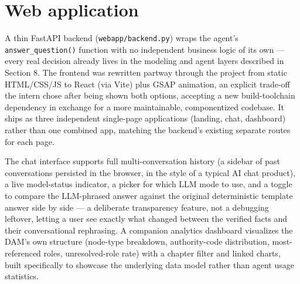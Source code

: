 \section{Web application}
A thin FastAPI backend (\texttt{webapp/\allowbreak{}backend.py}) wraps the agent's \texttt{answer\_\allowbreak{}question()} function with no independent business logic of its own — every real decision already lives in the modeling and agent layers described in Section 8. The frontend was rewritten partway through the project from static HTML/CSS/JS to React (via Vite) plus GSAP animation, an explicit trade-off the intern chose after being shown both options, accepting a new build-toolchain dependency in exchange for a more maintainable, componentized codebase. It ships as three independent single-page applications (landing, chat, dashboard) rather than one combined app, matching the backend's existing separate routes for each page.

The chat interface supports full multi-conversation history (a sidebar of past conversations persisted in the browser, in the style of a typical AI chat product), a live model-status indicator, a picker for which LLM mode to use, and a toggle to compare the LLM-phrased answer against the original deterministic template answer side by side — a deliberate transparency feature, not a debugging leftover, letting a user see exactly what changed between the verified facts and their conversational rephrasing. A companion analytics dashboard visualizes the DAM's own structure (node-type breakdown, authority-code distribution, most-referenced roles, unresolved-role rate) with a chapter filter and linked charts, built specifically to showcase the underlying data model rather than agent usage statistics.

